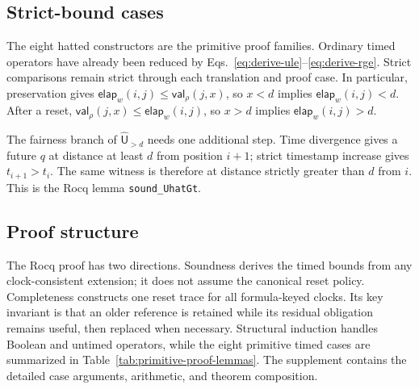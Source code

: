 \documentclass[10pt,journal,compsoc]{IEEEtran}
\newcommand{\hUntil}{\mathbin{\widehat{\mathsf{U}}}}
\newcommand{\CVal}{\mathsf{val}}
\newcommand{\elapsed}{\mathsf{elap}}
\begin{document}
\subsection{Strict-bound cases}
\label{subsec:main-strict-bounds}
The eight hatted constructors are the primitive proof families. Ordinary
timed operators have already been reduced by
Eqs.~\eqref{eq:derive-ule}--\eqref{eq:derive-rge}. Strict comparisons remain
strict through each translation and proof case. In particular, preservation
gives $\elapsed_w(i,j)\le\CVal_\rho(j,x)$, so $x<d$ implies
$\elapsed_w(i,j)<d$. After a reset,
$\CVal_\rho(j,x)\le\elapsed_w(i,j)$, so $x>d$ implies
$\elapsed_w(i,j)>d$.

The fairness branch of $\hUntil_{>d}$ needs one additional step. Time
divergence gives a future $q$ at distance at least $d$ from position $i+1$;
strict timestamp increase gives $t_{i+1}>t_i$. The same witness is therefore
at distance strictly greater than $d$ from $i$. This is the Rocq lemma
\texttt{sound\_UhatGt}.

\subsection{Proof structure}
\label{subsec:proof-outline}
The Rocq proof has two directions. Soundness derives the timed bounds from
any clock-consistent extension; it does not assume the canonical reset
policy. Completeness constructs one reset trace for all formula-keyed clocks.
Its key invariant is that an older reference is retained while its residual
obligation remains useful, then replaced when necessary. Structural induction
handles Boolean and untimed operators, while the eight primitive timed cases
are summarized in Table~\ref{tab:primitive-proof-lemmas}. The supplement
contains the detailed case arguments, arithmetic, and theorem composition.
\end{document}
